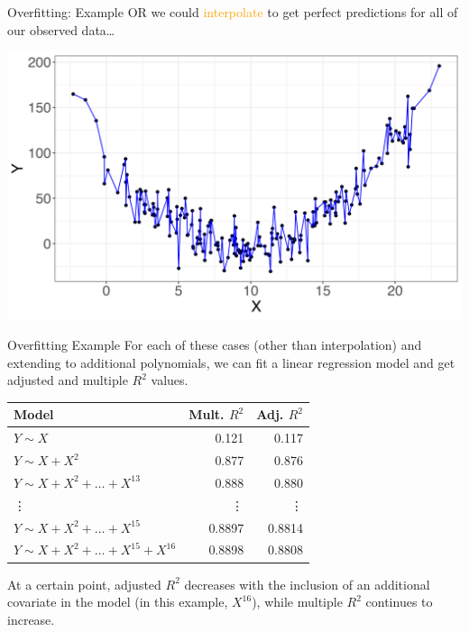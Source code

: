\documentclass[10pt,t]{beamer}
\begin{document}
\begin{frame}{Overfitting: Example}
OR we could \textcolor{orange}{interpolate} to get perfect predictions for all of our observed data\dots

\vspace{0.3cm}

\centering \includegraphics[scale=0.4]{overfit5.png}
\end{frame}

\begin{frame}{Overfitting Example}
For each of these cases (other than interpolation) and extending to additional polynomials, we can fit a linear regression model and get adjusted and multiple $R^2$ values.

\vspace{0.3cm}

\begin{table}
	\begin{tabular}{l|r|r}

Model & Mult. $R^2$ & Adj. $R^2$ \\
\hline
$Y \sim X$ & 0.121 & 0.117\\
\hline
$Y \sim X + X^2$ & 0.877 & 0.876\\
\hline
$Y \sim X + X^2 + \dots + X^{13}$ & 0.888 & 0.880 \\
\hline
\vdots & \vdots & \vdots \\
\hline
$Y \sim X + X^2 + \dots + X^{15}$ & 0.8897 & 0.8814 \\
\hline
$Y \sim X + X^2 + \dots + X^{15} + X^{16}$ & 0.8898 & 0.8808
\end{tabular}
\end{table}

\vspace{0.3cm} At a certain point, adjusted $R^2$ decreases with the inclusion of an additional covariate in the model (in this example, $X^16$), while multiple $R^2$ continues to increase.
	
\end{frame}
\end{document}
